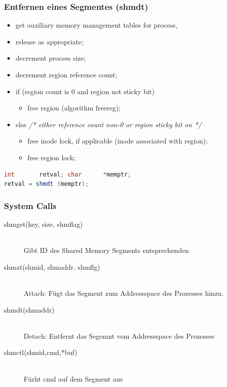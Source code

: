 \documentclass[10pt]{article}
\begin{document}
\subsubsection{Entfernen eines Segmentes (shmdt)}
\begin{itemize}
	\item get auxiliary memory management tables for process,
	\item release as appropriate;
	\item decrement process size;
	\item decrement region reference count;
	\item if (region count is 0 and region not sticky bit)
		\begin{itemize}
			\item free region (algorithm freereg);
		\end{itemize}
	\item else \textit{/* either reference count non-0 or region sticky bit on */}
		\begin{itemize}
			\item free inode lock, if applicable (inode associated with region);
			\item free region lock;
		\end{itemize}
\end{itemize}
\begin{lstlisting}[language=Java, caption=Entfernen eines Shared Memory Segments, style=JavaStyle]
int       retval; char      *memptr;
retval = shmdt (memptr);
\end{lstlisting}

\subsubsection{System Calls}
\begin{description}
	\item[shmget(key, size, shmflag)] \hfill \\ Gibt ID des Shared Memory Segments entsprechenden
	\item[shmat(shmid, shmaddr, shmflg)] \hfill \\ Attach: Fügt das  Segment zum Addressspace des Prozesses hinzu.
	\item[shmdt(shmaddr)] \hfill \\ Detach: Entfernt das Segemnt vom Addressspace des Prozesses
	\item[shmctl(shmid,cmd,*buf)] \hfill \\ Fürht cmd auf dem Segment aus
\end{description}
\end{document}
